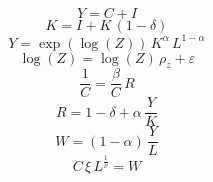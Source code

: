 \begin{dmath}
{Y}={C}+{I}
\end{dmath}
\begin{dmath}
{K}={I}+{K}\, \left(1-{\delta}\right)
\end{dmath}
\begin{dmath}
{Y}=\exp\left({\log(Z)}\right)\, {K}^{{\alpha}}\, {L}^{1-{\alpha}}
\end{dmath}
\begin{dmath}
{\log(Z)}={\log(Z)}\, {\rho_z}+{\varepsilon}
\end{dmath}
\begin{dmath}
\frac{1}{{C}}=\frac{{\beta}}{{C}}\, {R}
\end{dmath}
\begin{dmath}
{R}=1-{\delta}+{\alpha}\, \frac{{Y}}{{K}}
\end{dmath}
\begin{dmath}
{W}=\left(1-{\alpha}\right)\, \frac{{Y}}{{L}}
\end{dmath}
\begin{dmath}
{C}\, {\xi}\, {L}^{\frac{1}{{\nu}}}={W}
\end{dmath}
